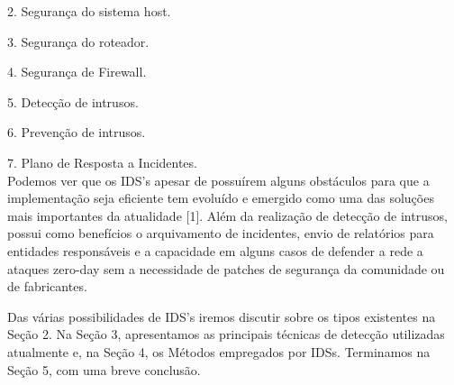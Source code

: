 \documentclass[conference]{IEEEtran}
\begin{document}
    2. Segurança do sistema host. 
    
    3. Segurança do roteador.
    
    4. Segurança de Firewall.
    
    5. Detecção de intrusos.
    
    6. Prevenção de intrusos.
    
    7. Plano de Resposta a Incidentes.
\\

    Podemos ver que os IDS's apesar de possuírem alguns obstáculos para que a implementação seja eficiente tem evoluído e emergido como uma das soluções mais importantes da atualidade [1]. Além da realização de detecção de intrusos, possui como benefícios o arquivamento de incidentes, envio de relatórios para entidades responsáveis e a capacidade em alguns casos de defender a rede a ataques zero-day sem a necessidade de patches de segurança da comunidade ou de fabricantes.
    
    Das várias possibilidades de IDS's iremos discutir sobre os tipos existentes na Seção 2. Na Seção 3, apresentamos as principais técnicas de detecção utilizadas atualmente e, na Seção 4, os Métodos empregados por IDSs. Terminamos na Seção 5, com uma breve conclusão.  

%
%

\end{document}
